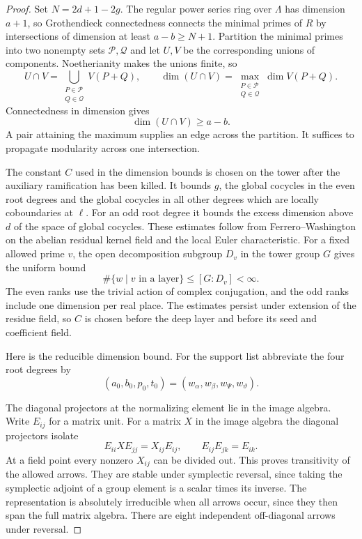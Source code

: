 \begin{proof}

Set \(N=2d+1-2g\). The regular power series ring over
\(\Lambda\) has dimension \(a+1\), so Grothendieck
connectedness connects the minimal primes of \(R\) by
intersections of dimension at least \(a-b\geq N+1\).
Partition the minimal primes into two nonempty sets \(\mathcal P,\mathcal Q\) and let \(U,V\) be the corresponding unions of components. Noetherianity makes the unions finite, so
\[
 U\cap V=\bigcup_{\substack{P\in\mathcal P\\Q\in\mathcal Q}}V(P+Q),
 \qquad
 \dim(U\cap V)=\max_{\substack{P\in\mathcal P\\Q\in\mathcal Q}}\dim V(P+Q).
\]
Connectedness in dimension gives
\[
 \dim(U\cap V)\ge a-b.
\]
A pair attaining the maximum supplies an edge across the partition. It suffices to
propagate modularity across one intersection.
\hfill\mbox{\cite{stacks-connectedness}}\label{cor:ordinary-promodularity-4}


The constant \(C\) used in the dimension bounds is chosen
on the tower after the auxiliary ramification has been
killed. It bounds \(g\), the global cocycles in the even
root degrees and the global cocycles in all other degrees
which are locally coboundaries at \(\ell\). For an odd
root degree it bounds the excess dimension above \(d\)
of the space of global cocycles. These estimates follow
from Ferrero--Washington on the abelian residual kernel
field and the local Euler characteristic. For a fixed allowed prime \(v\), the open decomposition subgroup \(D_v\) in the tower group \(G\) gives the uniform bound
\[
 \#\{w\mid v\text{ in a layer}\}\le[G:D_v]<\infty.
\]
The even ranks use the trivial action of complex
conjugation, and the odd ranks include one dimension per
real place. The estimates persist under extension of the
residue field, so \(C\) is chosen before the deep layer
and before its seed and coefficient field.

Here is the reducible dimension bound. For the support list abbreviate the four root degrees by
\[
 (a_0,b_0,p_0,t_0)=(w_\alpha,w_\beta,w_\Psi,w_\vartheta).
\]

The diagonal projectors at the normalizing element lie
in the image algebra. Write \(E_{ij}\) for a matrix unit. For a matrix \(X\) in the image algebra the diagonal projectors isolate
\[
 E_{ii}XE_{jj}=X_{ij}E_{ij},\qquad E_{ij}E_{jk}=E_{ik}.
\]
At a field point every nonzero \(X_{ij}\) can be divided out. This proves transitivity of the allowed arrows. They are stable under
symplectic reversal, since taking the symplectic adjoint
of a group element is a scalar times its inverse.
The representation is absolutely irreducible when all
arrows occur, since they then span the full matrix algebra.
There are eight independent off-diagonal arrows under
reversal.


\end{proof}
